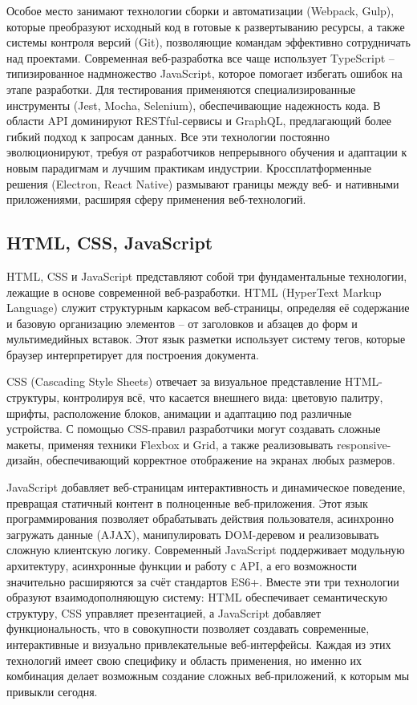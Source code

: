 \documentclass[referat]{SCWorks}
\begin{document}
Особое место занимают технологии сборки и автоматизации (Webpack, Gulp), которые преобразуют исходный код в готовые к развертыванию ресурсы, а также системы контроля версий (Git), позволяющие командам эффективно сотрудничать над проектами. Современная веб-разработка все чаще использует TypeScript -- типизированное надмножество JavaScript, которое помогает избегать ошибок на этапе разработки. Для тестирования применяются специализированные инструменты (Jest, Mocha, Selenium), обеспечивающие надежность кода. В области API доминируют RESTful-сервисы и GraphQL, предлагающий более гибкий подход к запросам данных. Все эти технологии постоянно эволюционируют, требуя от разработчиков непрерывного обучения и адаптации к новым парадигмам и лучшим практикам индустрии. Кроссплатформенные решения (Electron, React Native) размывают границы между веб- и нативными приложениями, расширяя сферу применения веб-технологий.

\subsection{HTML, CSS, JavaScript}

HTML, CSS и JavaScript представляют собой три фундаментальные технологии, лежащие в основе современной веб-разработки. HTML (HyperText Markup Language) служит структурным каркасом веб-страницы, определяя её содержание и базовую организацию элементов -- от заголовков и абзацев до форм и мультимедийных вставок. Этот язык разметки использует систему тегов, которые браузер интерпретирует для построения документа. 

CSS (Cascading Style Sheets) отвечает за визуальное представление HTML-структуры, контролируя всё, что касается внешнего вида: цветовую палитру, шрифты, расположение блоков, анимации и адаптацию под различные устройства. С помощью CSS-правил разработчики могут создавать сложные макеты, применяя техники Flexbox и Grid, а также реализовывать responsive-дизайн, обеспечивающий корректное отображение на экранах любых размеров.

JavaScript добавляет веб-страницам интерактивность и динамическое поведение, превращая статичный контент в полноценные веб-приложения. Этот язык программирования позволяет обрабатывать действия пользователя, асинхронно загружать данные (AJAX), манипулировать DOM-деревом и реализовывать сложную клиентскую логику. Современный JavaScript поддерживает модульную архитектуру, асинхронные функции и работу с API, а его возможности значительно расширяются за счёт стандартов ES6+. Вместе эти три технологии образуют взаимодополняющую систему: HTML обеспечивает семантическую структуру, CSS управляет презентацией, а JavaScript добавляет функциональность, что в совокупности позволяет создавать современные, интерактивные и визуально привлекательные веб-интерфейсы. Каждая из этих технологий имеет свою специфику и область применения, но именно их комбинация делает возможным создание сложных веб-приложений, к которым мы привыкли сегодня.\cite{web_technologies}
\end{document}
